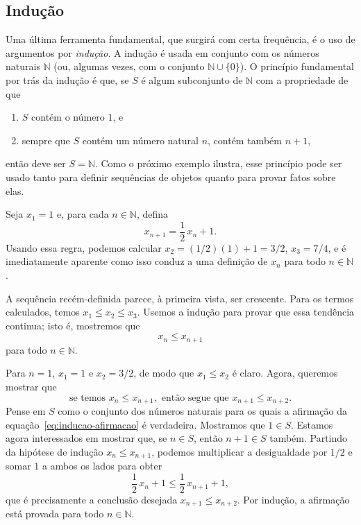 \subsection{Indução}\label{subsec:inducao}

Uma última ferramenta fundamental, que surgirá com certa frequência, é o uso de argumentos por \textit{indução}. A indução é usada em conjunto com os números naturais $\mathbb{N}$ (ou, algumas vezes, com o conjunto $\mathbb{N} \cup \{0\}$). O princípio fundamental por trás da indução é que, se $S$ é algum subconjunto de $\mathbb{N}$ com a propriedade de que  
\begin{enumerate}[label=(\roman*)]
\item $S$ contém o número $1$, e
\item sempre que $S$ contém um número natural $n$, contém também $n + 1$,
\end{enumerate}
então deve ser $S = \mathbb{N}$. Como o próximo exemplo ilustra, esse princípio pode ser usado tanto para definir sequências de objetos quanto para provar fatos sobre elas.

\begin{example}\label{ex:inducao-sequencia}
Seja $x_{1} = 1$ e, para cada $n \in \mathbb{N}$, defina
\[
x_{n+1} = \frac{1}{2}\, x_{n} + 1.
\]
Usando essa regra, podemos calcular $x_{2} = (1/2)(1) + 1 = 3/2$, $x_{3} = 7/4$, e é imediatamente aparente como isso conduz a uma definição de $x_{n}$ para todo $n \in \mathbb{N}$. 

A sequência recém-definida parece, à primeira vista, ser crescente. Para os termos calculados, temos $x_{1} \leq x_{2} \leq x_{3}$. Usemos a indução para provar que essa tendência continua; isto é, mostremos que  
\[
x_{n} \leq x_{n+1} \tag{4}\label{eq:inducao-afirmacao}
\]
para todo $n \in \mathbb{N}$.

Para $n = 1$, $x_{1} = 1$ e $x_{2} = 3/2$, de modo que $x_{1} \leq x_{2}$ é claro. Agora, queremos mostrar que
\[
\text{se temos } x_{n} \leq x_{n+1}, \text{ então segue que } x_{n+1} \leq x_{n+2}.
\]
Pense em $S$ como o conjunto dos números naturais para os quais a afirmação da equação~\eqref{eq:inducao-afirmacao} é verdadeira. Mostramos que $1 \in S$. Estamos agora interessados em mostrar que, se $n \in S$, então $n + 1 \in S$ também. Partindo da hipótese de indução $x_{n} \leq x_{n+1}$, podemos multiplicar a desigualdade por $1/2$ e somar $1$ a ambos os lados para obter
\[
\frac{1}{2}\, x_{n} + 1 \leq \frac{1}{2}\, x_{n+1} + 1,
\]
que é precisamente a conclusão desejada $x_{n+1} \leq x_{n+2}$. Por indução, a afirmação está provada para todo $n \in \mathbb{N}$.
\end{example}

